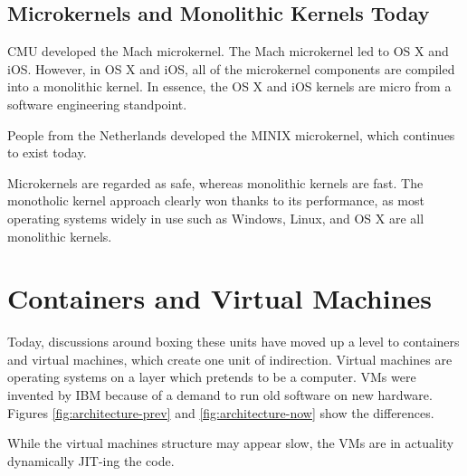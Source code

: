 \documentclass[twoside]{article}
\begin{document}
\subsection{Microkernels and Monolithic Kernels Today}

CMU developed the Mach microkernel. The Mach microkernel led to OS X and iOS. However, in OS X and iOS, all of the microkernel components are compiled into a monolithic kernel. In essence, the OS X and iOS kernels are micro from a software engineering standpoint.

People from the Netherlands developed the MINIX microkernel, which continues to exist today.

Microkernels are regarded as safe, whereas monolithic kernels are fast. The monotholic kernel approach clearly won thanks to its performance, as most operating systems widely in use such as Windows, Linux, and OS X are all monolithic kernels.

\section{Containers and Virtual Machines}

Today, discussions around boxing these units have moved up a level to containers and virtual machines, which create one unit of indirection. Virtual machines are operating systems on a layer which pretends to be a computer. VMs were invented by IBM because of a demand to run old software on new hardware. Figures \ref{fig:architecture-prev} and \ref{fig:architecture-now} show the differences.

While the virtual machines structure may appear slow, the VMs are in actuality dynamically JIT-ing the code.
\end{document}
